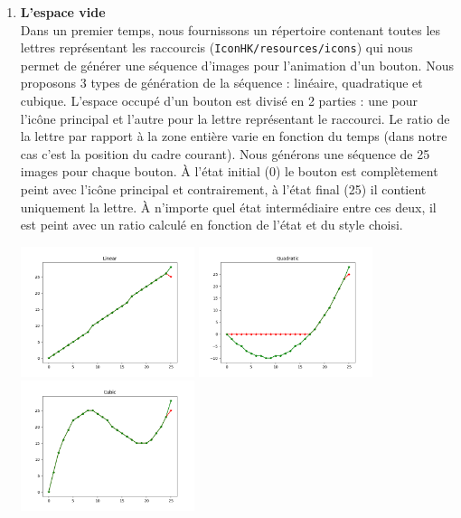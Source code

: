 \documentclass[12pt,a4paper]{article}
\begin{document}
\begin{enumerate}
\item {\large \textbf{L'espace vide}}\\
Dans un premier temps, nous fournissons un répertoire contenant toutes les lettres représentant les raccourcis (\texttt{IconHK/resources/icons}) qui nous permet de générer une séquence d'images pour l'animation d'un bouton. Nous proposons 3 types de génération de la séquence : linéaire, quadratique et cubique. L'espace occupé d'un bouton est divisé en 2 parties : une pour l'icône principal et l'autre pour la lettre représentant le raccourci. Le ratio de la lettre par rapport à la zone entière varie en fonction du temps (dans notre cas c'est la position du cadre courant). Nous générons une séquence de 25 images pour chaque bouton. À l'état initial (0) le bouton est complètement peint avec l'icône principal et contrairement, à l'état final (25) il contient uniquement la lettre. À n'importe quel état intermédiaire entre ces deux, il est peint avec un ratio calculé en fonction de l'état et du style choisi.
\begin{center}
	\includegraphics[width=0.4\textwidth]{linear.png}
	\includegraphics[width=0.4\textwidth]{quadratic.png}
	\includegraphics[width=0.4\textwidth]{cubic.png}
\end{center}

\end{enumerate}
\end{document}
